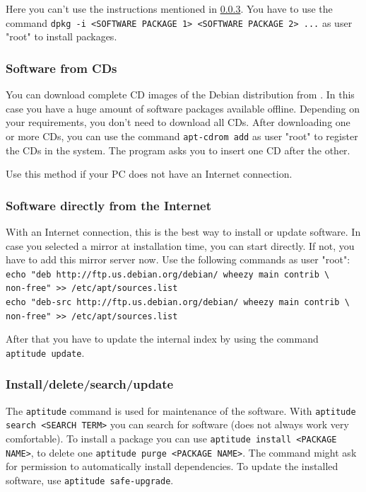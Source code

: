 \documentclass[a4paper,12pt,twoside]{article}
\begin{document}
Here you can't use the instructions mentioned in \ref{sct:software_management}.
You have to use the command \texttt{dpkg -i {\textless}SOFTWARE
PACKAGE 1{\textgreater} {\textless}SOFTWARE PACKAGE 2{\textgreater}
...} as user "root" to install packages.


\subsubsection{Software from CDs}
\label{sct:software_cd}
You can download complete CD images of the Debian distribution from
\cite{DEB4}. In this case you have a huge amount of software packages
available offline. Depending on your requirements, you
don't need to download all CDs. After downloading one
or more CDs, you can use the command \texttt{apt-cdrom
add} as user "root" to
register the CDs in the system. The program asks you to insert one CD
after the other.

Use this method if your PC does not have an Internet connection.


\subsubsection{Software directly from the Internet}
\label{sct:software_internet}
With an Internet connection, this is the best way to install or update
software. In case you selected a mirror at installation time, you can
start directly. If not, you have to add this mirror server now. Use the
following commands as user "root":
\bigskip
\\
\texttt{echo "deb http://ftp.us.debian.org/debian/ wheezy main contrib \textbackslash\\
    non-free"\ {\textgreater}{\textgreater} /etc/apt/sources.list}
\\
\texttt{echo "deb-src http://ftp.us.debian.org/debian/ wheezy main contrib \textbackslash\\
    non-free"\ {\textgreater}{\textgreater} /etc/apt/sources.list}

\bigskip
After that you have to update the internal index by using the command
\texttt{aptitude update}.


\subsubsection{Install/delete/search/update}
\label{sct:software_management}
The \texttt{aptitude} command is used for maintenance
of the software. With \texttt{aptitude search {\textless}SEARCH
TERM{\textgreater}} you can search for software (does not
always work very comfortable). To install a package you can use
\texttt{aptitude install {\textless}PACKAGE
NAME{\textgreater}}, to delete one
\texttt{aptitude purge {\textless}PACKAGE
NAME{\textgreater}}. The command might ask for permission
to automatically install dependencies. To update the installed
software, use \texttt{aptitude safe-upgrade}.
\end{document}
